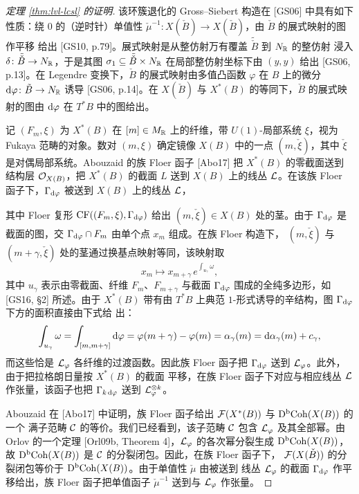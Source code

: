 \begin{proof}[定理 \ref{thm:lvl-lcsl} 的证明]
该环簇退化的 Gross--Siebert 构造在 [GS06] 中具有如下性质：绕 $0$ 的（逆时针）单值性
$\check\mu^{-1}\colon X(\check B)\to X(\check B)$，由 $\check B$ 的展式映射的图作平移
给出 [GS10, p.79]。展式映射是从整仿射万有覆盖 $\tilde{\check B}$ 到 $N_{\mathbb{R}}$ 的整仿射
浸入 $\delta\colon\tilde{\check B}\to N_{\mathbb{R}}$，于是其图
$\sigma_1\subseteq\tilde{\check B}\times N_{\mathbb{R}}$ 在局部整仿射坐标下由 $(y,y)$ 给出
[GS06, p.13]。在 Legendre 变换下，$\check B$ 的展式映射由多值凸函数 $\varphi$ 在 $B$
上的微分 $\mathrm{d}\varphi\colon\tilde B\to N_{\mathbb{R}}$ 诱导 [GS06, p.14]。在 $X(\check B)$ 与
$X^*(B)$ 的等同下，$\check B$ 的展式映射的图由 $\mathrm{d}\varphi$ 在 $T^*B$ 中的图给出。

记 $(F_m,\xi)$ 为 $X^*(B)$ 在 $[m]\in M_{\mathbb{R}}$ 上的纤维，带 $U(1)$-局部系统 $\xi$，视为
Fukaya 范畴的对象。数对 $(m,\xi)$ 确定镜像 $X(B)$ 中的一点 $(m,\check\xi)$，其中
$\check\xi$ 是对偶局部系统。Abouzaid 的族 Floer 函子 [Abo17] 把 $X^*(B)$ 的零截面送到
结构层 $\mathcal{O}_{X(B)}$，把 $X^*(B)$ 的截面 $L$ 送到 $X(B)$ 上的线丛 $\mathcal{L}$。在该族 Floer
函子下，$\Gamma_{\mathrm{d}\varphi}$ 被送到 $X(B)$ 上的线丛 $\mathcal{L}$，

其中 Floer 复形 $\mathrm{CF}((F_m,\xi),\Gamma_{\mathrm{d}\varphi})$ 给出 $(m,\check\xi)\in
X(B)$ 处的茎。由于 $\Gamma_{\mathrm{d}\varphi}$ 是截面的图，交
$\Gamma_{\mathrm{d}\varphi}\cap F_m$ 由单个点 $x_m$ 组成。在族 Floer 构造下，
$(m,\check\xi)$ 与 $(m+\gamma,\check\xi)$ 处的茎通过换基点映射等同，该映射取
\[
x_m\mapsto x_{m+\gamma}\,e^{\int_{u_\gamma}\omega},
\]
其中 $u_\gamma$ 表示由零截面、纤维 $F_m$、$F_{m+\gamma}$ 与截面
$\Gamma_{\mathrm{d}\varphi}$ 围成的全纯多边形，如 [GS16, §2] 所述。由于 $X^*(B)$ 带有由
$T^*B$ 上典范 $1$-形式诱导的辛结构，图 $\Gamma_{\mathrm{d}\varphi}$ 下方的面积直接由下式给
出：
\[
\int_{u_\gamma}\omega=\int_{[m,m+\gamma]}\mathrm{d}\varphi
=\varphi(m+\gamma)-\varphi(m)=\alpha_\gamma(m)=\mathrm{d}\alpha_\gamma(m)+c_\gamma,
\]
而这些恰是 $\mathcal{L}_\varphi$ 各纤维的过渡函数。因此族 Floer 函子把
$\Gamma_{\mathrm{d}\varphi}$ 送到 $\mathcal{L}_\varphi$。此外，由于把拉格朗日量按 $X^*(B)$ 的截面
平移，在族 Floer 函子下对应与相应线丛 $\mathcal{L}$ 作张量，该函子也把
$\Gamma_{k\,\mathrm{d}\varphi}$ 送到 $\mathcal{L}_\varphi^{\otimes k}$。


Abouzaid 在 [Abo17] 中证明，族 Floer 函子给出 $\mathcal{F}(X^*(B))$ 与 $\mathrm{D}^{\mathrm{b}}\mathrm{Coh}(X(B))$ 的一个
满子范畴 $\mathcal{C}$ 的等价。我们已经看到，该子范畴 $\mathcal{C}$ 包含 $\mathcal{L}_\varphi$ 及其全部幂。由
Orlov 的一个定理 [Orl09b, Theorem 4]，$\mathcal{L}_\varphi$ 的各次幂分裂生成
$\mathrm{D}^{\mathrm{b}}\mathrm{Coh}(X(B))$，故 $\mathrm{D}^{\mathrm{b}}\mathrm{Coh}(X(B))$ 是 $\mathcal{C}$ 的分裂闭包。因此，在族 Floer 函子下，
$\mathcal{F}(X(\check B))$ 的分裂闭包等价于 $\mathrm{D}^{\mathrm{b}}\mathrm{Coh}(X(B))$。由于单值性 $\check\mu$ 由被送到
线丛 $\mathcal{L}_\varphi$ 的截面 $\Gamma_{\mathrm{d}\varphi}$ 作平移给出，族 Floer 函子把单值函子
$\check\mu^{-1}$ 送到与 $\mathcal{L}_\varphi$ 作张量。


\end{proof}
